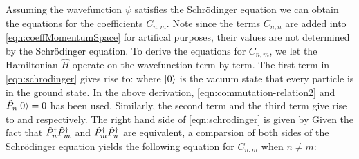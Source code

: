 Assuming the wavefunction $\psi$ satisfies the Schr{\" o}dinger equation
we can obtain the equations for the coefficients $C_{n, m}$. Note since the terms $C_{n, n}$ are added into
 \autoref{eqn:coeffMomentumSpace} for artifical purposes, their values are not determined by the Schr{\" o}dinger
 equation. To derive the equations for $C_{n, m}$, we let the Hamiltonian $\hat{H}$ operate on the wavefunction
 term by term. The first term in \autoref{eqn:schrodinger} gives rise to:
where $| 0 \rangle$ is the vacuum state that every particle is in the ground state. 
In the above derivation, \autoref{eqn:commutation-relation2} and $\hat{P}_{n}| 0 \rangle = 0$ has been used. Similarly, the
 second term and the third term give rise to 
and
respectively. The right hand side of \autoref{eqn:schrodinger} is given by
Given the fact that $\hat{P}^{\dagger}_{n}\hat{P}^{\dagger}_{m}$ and $\hat{P}^{\dagger}_{m}\hat{P}^{\dagger}_{n}$ are equivalent, a comparsion of both sides of the
 Schr{\"o}dinger equation yields the following equation for $C_{n, m}$ when $n \neq m$:
